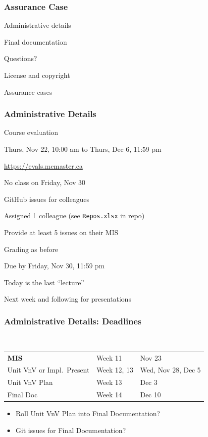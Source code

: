\documentclass[t,12pt,numbers,fleqn]{beamer}
\begin{document}



\begin{frame}
\frametitle{Assurance Case}

\bi
\item Administrative details
\item Final documentation
\item Questions?
\item License and copyright
\item Assurance cases
\ei
\end{frame}


\begin{frame}
\frametitle{Administrative Details}

\bi
\item Course evaluation
\bi
\item Thurs, Nov 22, 10:00 am to Thurs, Dec 6, 11:59 pm
\item \url{https://evals.mcmaster.ca}
\ei
\item No class on Friday, Nov 30
\item GitHub issues for colleagues
\bi
\item Assigned 1 colleague (see \texttt{Repos.xlsx} in repo)
\item Provide at least 5 issues on their MIS
\item Grading as before
\item Due by Friday, Nov 30, 11:59 pm
\ei
\item Today is the last ``lecture''
\item Next week and following for presentations
\ei

\end{frame}


\begin{frame}
\frametitle{Administrative Details: Deadlines}
~\newline
\begin{tabular}{l l l}
\textbf{MIS} & Week 11 & Nov 23\\
Unit VnV or Impl.\ Present & Week 12, 13 & Wed, Nov 28, Dec 5\\
Unit VnV Plan & Week 13 & Dec 3\\
Final Doc & Week 14 & Dec 10\\
\end {tabular}

\begin{itemize}
\item Roll Unit VnV Plan into Final Documentation?
\item Git issues for Final Documentation?
\end{itemize}

\end{frame}
\end{document}
